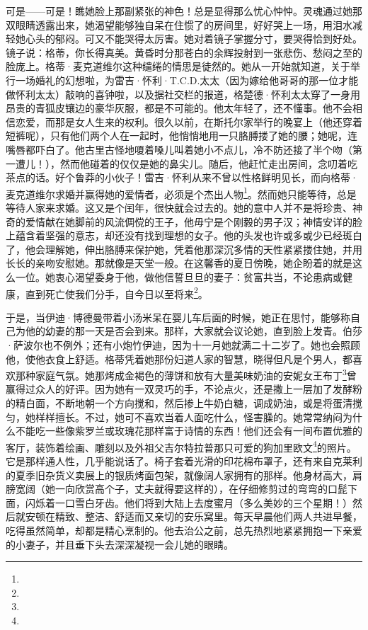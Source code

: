 \par 可是——可是！瞧她脸上那副紧张的神色！总是显得那么忧心忡忡。灵魂通过她那双眼睛透露出来，她渴望能够独自呆在住惯了的房间里，好好哭上一场，用泪水减轻她心头的郁闷。可又不能哭得太厉害。她对着镜子掌握分寸，要哭得恰到好处。镜子说：格蒂，你长得真美。黄昏时分那苍白的余辉投射到一张悲伤、愁闷之至的脸庞上。格蒂·麦克道维尔这种缱绻的情思是徒然的。她从一开始就知道，关于举行一场婚礼的幻想啦，为雷吉·怀利·T.C.D.太太（因为嫁给他哥哥的那一位才能做怀利太太）敲响的喜钟啦，以及据社交栏的报道，格楚德·怀利太太穿了一身用昂贵的青狐皮镶边的豪华灰服，都是不可能的。他太年轻了，还不懂事。他不会相信恋爱，而那是女人生来的权利。很久以前，在斯托尔家举行的晚宴上（他还穿着短裤呢），只有他们两个人在一起时，他悄悄地用一只胳膊搂了她的腰；她呢，连嘴唇都吓白了。他古里古怪地嗄着嗓儿叫着她小不点儿，冷不防还接了半个吻（第一遭儿！），然而他碰着的仅仅是她的鼻尖儿。随后，他赶忙走出房间，念叨着吃茶点的话。好个鲁莽的小伙子！雷吉·怀利从来不曾以性格鲜明见长，而向格蒂·麦克道维尔求婚并赢得她的爱情者，必须是个杰出人物\footnote{}。然而她只能等待，总是等待人家来求婚。这又是个闰年，很快就会过去的。她的意中人并不是将珍贵、神奇的爱情献在她脚前的风流倜傥的王子，他毋宁是个刚毅的男子汉；神情安详的脸上蕴含着坚强的意志，却还没有找到理想的女子。他的头发也许或多或少已经斑白了，他会理解她，伸出胳膊来保护她，凭着他那深沉多情的天性紧紧搂住她，并用长长的亲吻安慰她。那就像是天堂一般。在这馨香的夏日傍晚，她企盼着的就是这么一位。她衷心渴望委身于他，做他信誓旦旦的妻子：贫富共当，不论患病或健康，直到死亡使我们分手，自今日以至将来\footnote{}。
\par 于是，当伊迪·博德曼带着小汤米呆在婴儿车后面的时候，她正在思忖，能够称自己为他的幼妻的那一天是否会到来。那样，大家就会议论她，直到脸上发青。伯莎·萨波尔也不例外；还有小炮竹伊迪，因为十一月她就满二十二岁了。她也会照顾他，使他衣食上舒适。格蒂凭着她那份妇道人家的智慧，晓得但凡是个男人，都喜欢那种家庭气氛。她那烤成金褐色的薄饼和放有大量美味奶油的安妮女王布丁\footnote{}曾赢得过众人的好评。因为她有一双灵巧的手，不论点火，还是撒上一层加了发酵粉的精白面，不断地朝一个方向搅和，然后掺上牛奶白糖，调成奶油，或是将蛋清搅匀，她样样擅长。不过，她可不喜欢当着人面吃什么，怪害臊的。她常常纳闷为什么不能吃一些像紫罗兰或玫瑰花那样富于诗情的东西！他们还会有一间布置优雅的客厅，装饰着绘画、雕刻以及外祖父吉尔特拉普那只可爱的狗加里欧文\footnote{}的照片。它是那样通人性，几乎能说话了。椅子套着光滑的印花棉布罩子，还有来自克莱利的夏季旧杂货义卖展上的银质烤面包架，就像阔人家拥有的那样。他身材高大，肩膀宽阔（她一向欣赏高个子，丈夫就得要这样的），在仔细修剪过的弯弯的口髭下面，闪烁着一口雪白牙齿。他们将到大陆上去度蜜月（多么美妙的三个星期！）然后就安顿在精致、整洁、舒适而又亲切的安乐窝里。每天早晨他们两人共进早餐，吃得虽然简单，却都是精心烹制的。他去治公之前，总先热烈地紧紧拥抱一下亲爱的小妻子，并且垂下头去深深凝视一会儿她的眼睛。
